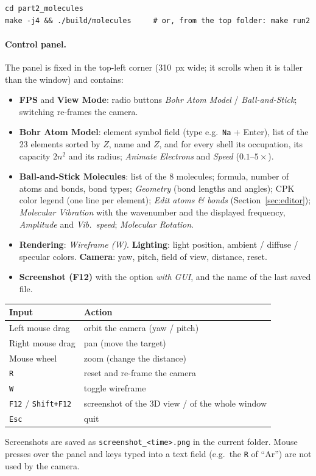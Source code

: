 \documentclass[a4paper, 11pt]{article}
\newcommand{\code}[1]{\texttt{#1}}
\begin{document}
\begin{verbatim}
cd part2_molecules
make -j4 && ./build/molecules     # or, from the top folder: make run2
\end{verbatim}

\paragraph{Control panel.} The panel is fixed in the top-left corner (310~px wide; it scrolls when it is taller than the window) and contains:
\begin{itemize}
  \item \textbf{FPS} and \textbf{View Mode}: radio buttons \emph{Bohr Atom Model} / \emph{Ball-and-Stick}; switching re-frames the camera.
  \item \textbf{Bohr Atom Model}: element symbol field (type e.g.\ \code{Na} + Enter), list of the 23 elements sorted by $Z$, name and $Z$, and for every
        shell its occupation, its capacity $2n^2$ and its radius; \emph{Animate Electrons} and \emph{Speed} ($0.1$--$5\times$).
  \item \textbf{Ball-and-Stick Molecules}: list of the 8 molecules; formula, number of atoms and bonds, bond types; \emph{Geometry} (bond lengths
        and angles); CPK color legend (one line per element); \emph{Edit atoms \& bonds} (Section~\ref{sec:editor}); \emph{Molecular Vibration}
        with the wavenumber and the displayed frequency, \emph{Amplitude} and \emph{Vib.\ speed}; \emph{Molecular Rotation}.
  \item \textbf{Rendering}: \emph{Wireframe (W)}. \textbf{Lighting}: light position, ambient / diffuse / specular colors.
        \textbf{Camera}: yaw, pitch, field of view, distance, reset.
  \item \textbf{Screenshot (F12)} with the option \emph{with GUI}, and the name of the last saved file.
\end{itemize}

\begin{center}
\small
\begin{tabular}{@{}ll@{}}
\toprule
\textbf{Input} & \textbf{Action}\\
\midrule
Left mouse drag & orbit the camera (yaw / pitch)\\
Right mouse drag & pan (move the target)\\
Mouse wheel & zoom (change the distance)\\
\texttt{R} & reset and re-frame the camera\\
\texttt{W} & toggle wireframe\\
\texttt{F12} / \texttt{Shift+F12} & screenshot of the 3D view / of the whole window\\
\texttt{Esc} & quit\\
\bottomrule
\end{tabular}
\end{center}
Screenshots are saved as \texttt{screenshot\_<time>.png} in the current folder. Mouse presses over the panel and keys typed into a text field (e.g.\ the \texttt{R} of ``Ar'') are not used by the camera.
\end{document}
